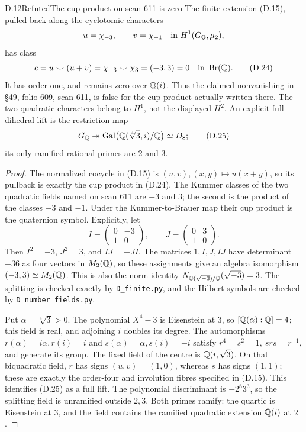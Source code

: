 \begin{statement}{D.12}{Refuted}{The cup product on scan 611 is zero}
The finite extension (D.15), pulled back along the cyclotomic
characters
\[
 u=\chi_{-3},\qquad v=\chi_{-1}
       \quad\hbox{in }H^1(G_\mathbb Q,\mu _2),
\]
has class
\[
 c=u\smile(u+v)=\chi_{-3}\smile\chi_3
                  =(-3,3)=0\quad\hbox{in }\operatorname{Br}(\mathbb Q).
 \tag{D.24}
\]
It has order one, and remains zero over \(\mathbb Q(i)\).
Thus the claimed nonvanishing in \S49, folio 609,
scan 611, is false for the cup product actually written there.
The two quadratic characters belong to \(H^1\), not the
displayed \(H^2\).
An explicit full dihedral lift is the restriction map
\[
 G_\mathbb Q\twoheadrightarrow
 \operatorname{Gal}\bigl(\mathbb Q(\sqrt[4]{3},i)/\mathbb Q\bigr)\simeq D_8;
 \tag{D.25}
\]
its only ramified rational primes are \(2\) and \(3\).
\end{statement}
\begin{proof}
The normalized cocycle in (D.15) is
\((u,v),(x,y)\mapsto u(x+y)\), so its pullback is exactly
the cup product in (D.24).  The Kummer classes of the two
quadratic fields named on scan 611 are \(-3\) and \(3\);
the second is the product of the classes \(-3\) and \(-1\).
Under the Kummer-to-Brauer map their cup product is the
quaternion symbol.  Explicitly, let
\[
 I=\begin{pmatrix}0&-3\\1&0\end{pmatrix},\qquad
 J=\begin{pmatrix}0&3\\1&0\end{pmatrix}.
\]
Then \(I^2=-3\), \(J^2=3\), and \(IJ=-JI\).
The matrices \(1,I,J,IJ\) have determinant \(-36\) as four
vectors in \(M_2(\mathbb Q)\), so these assignments give an algebra
isomorphism \((-3,3)\simeq M_2(\mathbb Q)\).
This is also the norm identity \(N_{\mathbb Q(\sqrt{-3})/\mathbb Q}
(\sqrt{-3})=3\).  The splitting is checked exactly by
\texttt{D\_finite.py}, and the Hilbert symbols are checked
by \texttt{D\_number\_fields.py}.

Put \(\alpha=\sqrt[4]{3}>0\).  The polynomial \(X^4-3\) is
Eisenstein at \(3\), so \([\mathbb Q(\alpha):\mathbb Q]=4\); this field is
real, and adjoining \(i\) doubles its degree.
The automorphisms \(r(\alpha)=i\alpha,r(i)=i\) and
\(s(\alpha)=\alpha,s(i)=-i\) satisfy
\(r^4=s^2=1,\ srs=r^{-1}\), and generate its group.
The fixed field of the centre is \(\mathbb Q(i,\sqrt3)\).
On that biquadratic field, \(r\) has signs
\((u,v)=(1,0)\), whereas \(s\) has signs \((1,1)\);
these are exactly the order-four and involution fibres
specified in (D.15).  This identifies (D.25) as a full lift.
The polynomial discriminant is \(-2^8 3^3\), so the splitting
field is unramified outside \(2,3\).  Both primes ramify:
the quartic is Eisenstein at \(3\), and the field
contains the ramified quadratic extension \(\mathbb Q(i)\) at \(2\).
\end{proof}

